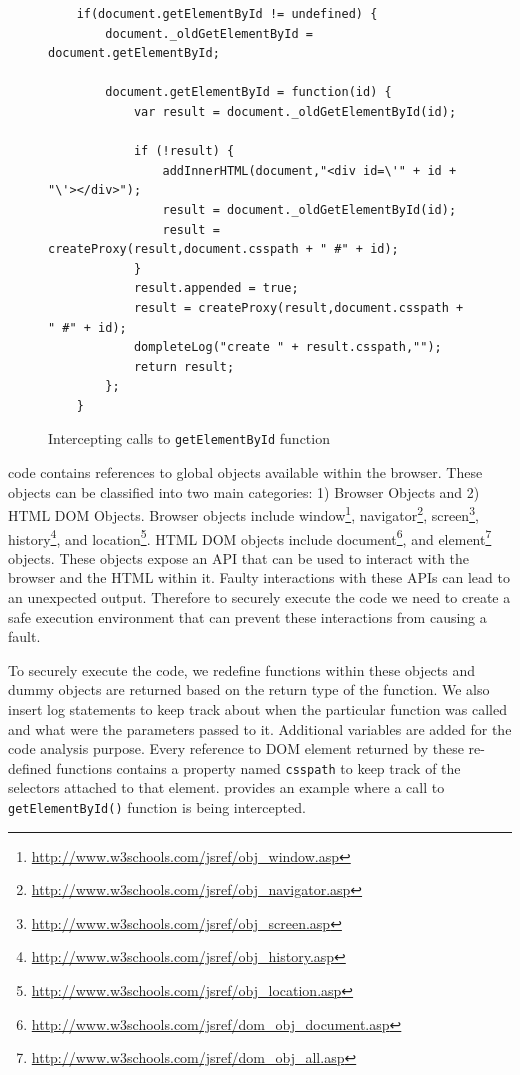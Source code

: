 			\begin{figure}
			\medskip
			\begin{lstlisting}
	if(document.getElementById != undefined) { 
		document._oldGetElementById = document.getElementById; 
			
		document.getElementById = function(id) { 
			var result = document._oldGetElementById(id); 
				
			if (!result) { 
				addInnerHTML(document,"<div id=\'" + id + "\'></div>"); 
				result = document._oldGetElementById(id); 
				result = createProxy(result,document.csspath + " #" + id); 
			} 
			result.appended = true;
			result = createProxy(result,document.csspath + " #" + id);
			dompleteLog("create " + result.csspath,"");
			return result; 
		}; 
	}
			\end{lstlisting}
			\caption{Intercepting calls to \texttt{getElementById} function}
			\label{Fig:Environment}
			\end{figure}
			
		
			\javascript code contains references to global objects available within the browser. These objects can be classified into two main categories: 1) Browser Objects and 2) HTML DOM Objects. Browser objects include window\footnote{\url{http://www.w3schools.com/jsref/obj_window.asp}}, navigator\footnote{\url{http://www.w3schools.com/jsref/obj_navigator.asp}}, screen\footnote{\url{http://www.w3schools.com/jsref/obj_screen.asp}}, history\footnote{\url{http://www.w3schools.com/jsref/obj_history.asp}},  and location\footnote{\url{http://www.w3schools.com/jsref/obj_location.asp}}. HTML DOM objects include document\footnote{\url{http://www.w3schools.com/jsref/dom_obj_document.asp}}, and element\footnote{\url{http://www.w3schools.com/jsref/dom_obj_all.asp}} objects. These objects expose an API that can be used to interact with the browser and the HTML within it. Faulty interactions with these APIs can lead to an unexpected output. Therefore to securely execute the code we need to create a safe execution environment that can prevent these interactions from causing a fault.
			
			To securely execute the \javascript code, we redefine functions within these objects and dummy objects are returned based on the return type of the function. We also insert log statements to keep track about when the particular function was called and what were the parameters passed to it. Additional variables are added for the code analysis purpose. Every reference to DOM element returned by these re-defined functions contains a property named \texttt{csspath} to keep track of the \css selectors attached to that element.  provides an example where a call to \texttt{getElementById()} function is being intercepted.

